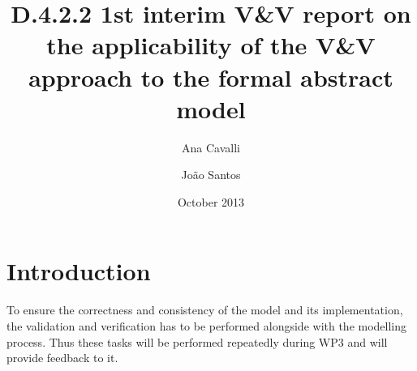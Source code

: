 \documentclass{template/openetcs_article}
\begin{document}
\frontmatter
{}




\title{D.4.2.2 1st interim V\&V report on the applicability of the V\&V approach to the formal abstract model}

\subtitle{}

\date{October 2013}

\author{Ana Cavalli \and João Santos}

  

\reporttype{}



\begin{abstract}

\lipsum[12-13]

\end{abstract}

\maketitle
\tableofcontents
\listoffiguresandtables
\newpage




\section*{Introduction}

To ensure the correctness and consistency of the model and its implementation, the validation
and verification has to be performed alongside with the modelling process. Thus these tasks will
be performed repeatedly during WP3 and will provide feedback to it.
\end{document}
